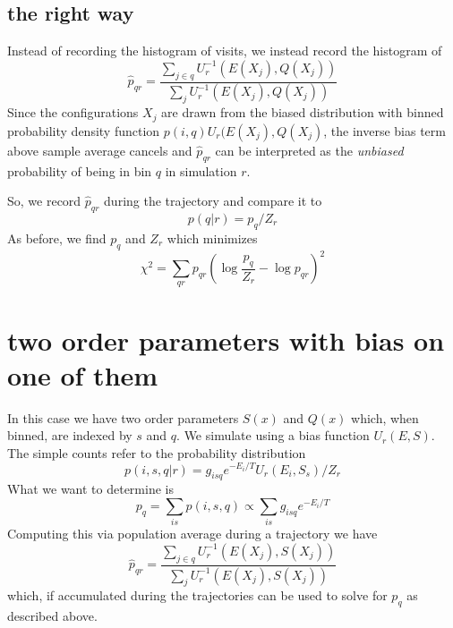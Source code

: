 \documentclass[a4paper]{article}
\begin{document}
\subsection{the right way}

Instead of recording the histogram of visits, we instead record the histogram of
\begin{equation}
\hat{p}_{qr} = \frac{\sum_{j\in q} U_r^{-1}(E(X_j), Q(X_j))}{\sum_{j} U_r^{-1}(E(X_j), Q(X_j))}
\end{equation}
Since the configurations $X_j$ are drawn from the biased distribution with binned probability density function $p(i,q) U_r(E(X_j), Q(X_j)$,
the inverse bias term above sample average cancels and $\hat{p}_{qr}$ can be interpreted as the \emph{unbiased} probability of being in bin $q$ in simulation $r$.

So, we record $\hat{p}_{qr}$ during the trajectory and compare it to
\begin{equation}
p(q|r) = p_{q} / Z_{r}
\end{equation}
As before, we find $p_q$ and $Z_r$ which minimizes
\begin{equation}
\chi^2 = \sum_{qr} p_{qr} \left( \log \frac{p_{q}}{Z_r} - \log p_{qr} \right)^2
\end{equation}


\section{two order parameters with bias on one of them}

In this case we have two order parameters $S(x)$ and $Q(x)$ which, when binned,
are indexed by $s$ and $q$.  We simulate using a bias function $U_r(E, S)$.
The simple counts refer to the probability distribution
\begin{equation}
p(i,s,q|r) = g_{isq} e^{-E_i / T} U_r(E_i, S_s) / Z_{r}
\end{equation}
What we want to determine is
\begin{equation}
p_q = \sum_{is} p(i,s,q) \propto \sum_{is} g_{isq} e^{-E_i / T}
\end{equation}
Computing this via population average during a trajectory we have
\begin{equation}
\hat{p}_{qr} = \frac{\sum_{j\in q} U_r^{-1}(E(X_j), S(X_j))}{\sum_{j} U_r^{-1}(E(X_j), S(X_j))}
\end{equation}
which, if accumulated during the trajectories can be used to solve for $p_q$ as described above.
\end{document}
